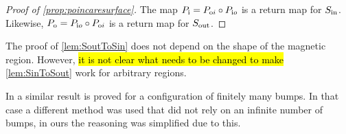 \begin{proof}[Proof of \cref{prop:poincaresurface}]
The map $P_{\text i} = P_{\text oi}\circ P_{\text io}$ is a return map for $S_\text{in}$. Likewise, $P_{\text o} = P_{\text io}\circ P_{\text oi}$ is a return map for $S_\text{out}$.
\end{proof}

The proof of \cref{lem:SoutToSin} does not depend on the shape of the magnetic region. However, \hl{it is not clear what needs to be changed to make } \cref{lem:SinToSout} work for arbitrary regions.

In \cite{Knauf_2017} a similar result is proved for a configuration of finitely many bumps. In that case a different method was used that did not rely on an infinite number of bumps, in ours the reasoning was simplified due to this.
